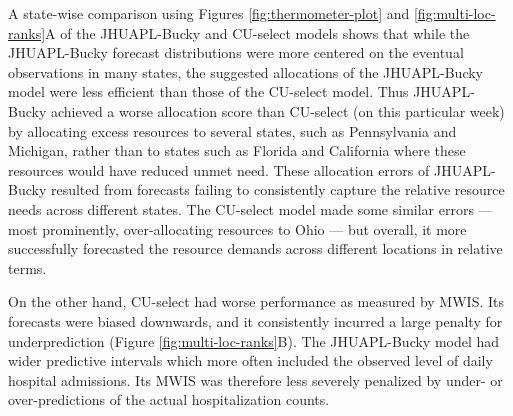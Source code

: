 \documentclass{article}\usepackage[]{graphicx}\usepackage[]{xcolor}
\begin{document}
A state-wise comparison using Figures \ref{fig:thermometer-plot} and \ref{fig:multi-loc-ranks}A of the JHUAPL-Bucky and
CU-select models shows that while the JHUAPL-Bucky forecast distributions were more centered on the eventual
observations in many states, the suggested allocations of the JHUAPL-Bucky model were less efficient than those of the
CU-select model. Thus JHUAPL-Bucky achieved a worse allocation score than CU-select (on this particular week) by
allocating excess resources to several states, such as Pennsylvania and Michigan, rather than to states such as Florida
and California where these resources would have reduced unmet need.  These allocation errors of JHUAPL-Bucky resulted
from forecasts failing to consistently capture the relative resource needs across different states. The CU-select model
made some similar errors — most prominently, over-allocating resources to Ohio — but overall, it more successfully
forecasted the resource demands across different locations in relative terms.

On the other hand, CU-select had worse performance as measured by MWIS. Its forecasts were biased downwards, and it
consistently incurred a large penalty for underprediction (Figure \ref{fig:multi-loc-ranks}B). The JHUAPL-Bucky model
had wider predictive intervals which more often included the observed level of daily hospital admissions. Its MWIS was
therefore less severely penalized by under- or over-predictions of the actual hospitalization counts.
\end{document}
